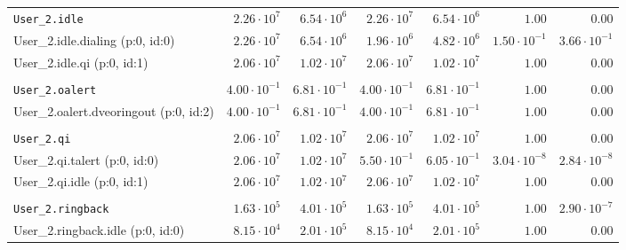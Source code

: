 \begin{table}[htbp]
{\begin{tabular}{lrrrrrr}
\\[-8pt]\texttt{User\_2.idle}                        &  $2.26 \cdot 10^{7}$ &  $6.54 \cdot 10^{6}$ &  $2.26 \cdot 10^{7}$ &  $6.54 \cdot 10^{6}$ &               $1.00$ &               $0.00$ \\
\hspace{3mm}User\_2.idle.dialing (p:0, id:0)         &  $2.26 \cdot 10^{7}$ &  $6.54 \cdot 10^{6}$ &  $1.96 \cdot 10^{6}$ &  $4.82 \cdot 10^{6}$ & $1.50 \cdot 10^{-1}$ & $3.66 \cdot 10^{-1}$ \\
\hspace{3mm}User\_2.idle.qi (p:0, id:1)              &  $2.06 \cdot 10^{7}$ &  $1.02 \cdot 10^{7}$ &  $2.06 \cdot 10^{7}$ &  $1.02 \cdot 10^{7}$ &               $1.00$ &               $0.00$ \\
\\[-8pt]\texttt{User\_2.oalert}                      & $4.00 \cdot 10^{-1}$ & $6.81 \cdot 10^{-1}$ & $4.00 \cdot 10^{-1}$ & $6.81 \cdot 10^{-1}$ &               $1.00$ &               $0.00$ \\
\hspace{3mm}User\_2.oalert.dveoringout (p:0, id:2)   & $4.00 \cdot 10^{-1}$ & $6.81 \cdot 10^{-1}$ & $4.00 \cdot 10^{-1}$ & $6.81 \cdot 10^{-1}$ &               $1.00$ &               $0.00$ \\
\\[-8pt]\texttt{User\_2.qi}                          &  $2.06 \cdot 10^{7}$ &  $1.02 \cdot 10^{7}$ &  $2.06 \cdot 10^{7}$ &  $1.02 \cdot 10^{7}$ &               $1.00$ &               $0.00$ \\
\hspace{3mm}User\_2.qi.talert (p:0, id:0)            &  $2.06 \cdot 10^{7}$ &  $1.02 \cdot 10^{7}$ & $5.50 \cdot 10^{-1}$ & $6.05 \cdot 10^{-1}$ & $3.04 \cdot 10^{-8}$ & $2.84 \cdot 10^{-8}$ \\
\hspace{3mm}User\_2.qi.idle (p:0, id:1)              &  $2.06 \cdot 10^{7}$ &  $1.02 \cdot 10^{7}$ &  $2.06 \cdot 10^{7}$ &  $1.02 \cdot 10^{7}$ &               $1.00$ &               $0.00$ \\
\\[-8pt]\texttt{User\_2.ringback}                    &  $1.63 \cdot 10^{5}$ &  $4.01 \cdot 10^{5}$ &  $1.63 \cdot 10^{5}$ &  $4.01 \cdot 10^{5}$ &               $1.00$ & $2.90 \cdot 10^{-7}$ \\
\hspace{3mm}User\_2.ringback.idle (p:0, id:0)        &  $8.15 \cdot 10^{4}$ &  $2.01 \cdot 10^{5}$ &  $8.15 \cdot 10^{4}$ &  $2.01 \cdot 10^{5}$ &               $1.00$ &               $0.00$ \\

\end{tabular}}
\end{table}
